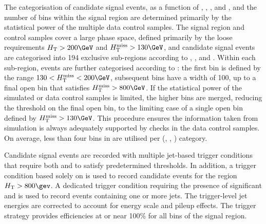 The categorisation of candidate signal events, as a function of \njet,
\nb, \scalht, and \HTmiss, and the number of bins within the signal
region are determined primarily by the statistical power of the
multiple data control samples. The signal region and control samples
cover a large phase space, defined primarily by the loose requirements
$\scalht > 200\GeV$ and $\HTmiss > 130\GeV$, and candidate signal
events are categorised into 194 exclusive sub-regions according to
\njet, \nb, and \scalht. Within each sub-region, events are further
categorised according to \HTmiss: the first bin is defined by the
range $130 < \HTmiss < 200\GeV$, subsequent bins have a width of
100\GeV, up to a final open bin that satisfies $\HTmiss > 800\GeV$. If
the statistical power of the simulated or data control samples is
limited, the higher \HTmiss bins are merged, reducing the threshold on
the final open bin, to the limiting case of a single open bin defined
by $\HTmiss > 130\GeV$. This procedure ensures the information taken
from simulation is always adequately supported by checks in the data
control samples. On average, less than four bins in \HTmiss are
utilised per (\njet, \nb, \scalht) category.

Candidate signal events are recorded with multiple jet-based trigger
conditions that require both \scalht and \alphat to satisfy
predetermined thresholds. In addition, a trigger condition based
solely on \scalht is used to record candidate events for the region
$\scalht > 800\gev$. A dedicated trigger condition requiring the
presence of significant \mht and \ETmiss is used to record events
containing one or more jets. The trigger-level jet energies are
corrected to account for energy scale and pileup effects. The trigger
strategy provides efficiencies at or near 100\% for all bins of the
signal region.
